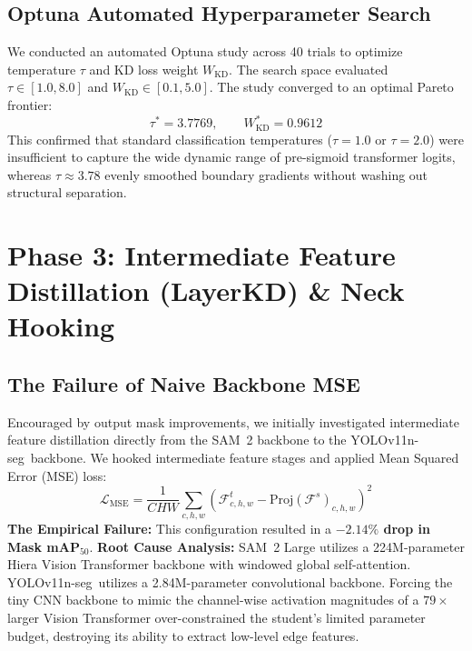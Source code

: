 \documentclass[11pt,a4paper]{article}
\newcommand{\yolo}{YOLOv11n-seg}
\begin{document}
\subsection{Optuna Automated Hyperparameter Search}
We conducted an automated Optuna study across 40 trials to optimize temperature $\tau$ and KD loss weight $W_{\text{KD}}$. 
The search space evaluated $\tau \in [1.0, 8.0]$ and $W_{\text{KD}} \in [0.1, 5.0]$.
The study converged to an optimal Pareto frontier:
\begin{equation}
  \tau^* = 3.7769, \qquad W_{\text{KD}}^* = 0.9612
\end{equation}
This confirmed that standard classification temperatures ($\tau=1.0$ or $\tau=2.0$) were insufficient to capture the wide dynamic range of pre-sigmoid transformer logits, whereas $\tau \approx 3.78$ evenly smoothed boundary gradients without washing out structural separation.

\section{Phase 3: Intermediate Feature Distillation (LayerKD) \& Neck Hooking}
\label{sec:phase3}

\subsection{The Failure of Naive Backbone MSE}
Encouraged by output mask improvements, we initially investigated intermediate feature distillation directly from the SAM~2 backbone to the \yolo\ backbone. 
We hooked intermediate feature stages and applied Mean Squared Error (MSE) loss:
\begin{equation}
  \mathcal{L}_{\text{MSE}} = \frac{1}{CHW} \sum_{c,h,w} \left( \mathcal{F}^t_{c,h,w} - \text{Proj}(\mathcal{F}^s)_{c,h,w} \right)^2
\end{equation}
\textbf{The Empirical Failure:} This configuration resulted in a \textbf{$-2.14\%$ drop in Mask mAP$_{50}$}. 
\textbf{Root Cause Analysis:} SAM~2 Large utilizes a 224M-parameter Hiera Vision Transformer backbone with windowed global self-attention. 
\yolo\ utilizes a 2.84M-parameter convolutional backbone. 
Forcing the tiny CNN backbone to mimic the channel-wise activation magnitudes of a $79\times$ larger Vision Transformer over-constrained the student's limited parameter budget, destroying its ability to extract low-level edge features.
\end{document}
